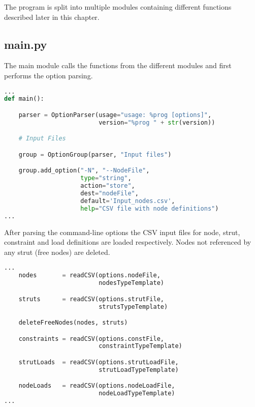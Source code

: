 The program is split into multiple modules containing different functions described later in this chapter.

\subsection{main.py}
\label{subsec:main.py}

The main module calls the functions from the different modules and first performs the option parsing.

\begin{inconsolata}
\begin{minipage}{\linewidth}
\begin{lstlisting}[language=python]
...
def main():

    parser = OptionParser(usage="usage: %prog [options]",
                          version="%prog " + str(version))

    # Input Files                                       

    group = OptionGroup(parser, "Input files")

    group.add_option("-N", "--NodeFile",
                     type="string",
                     action="store",
                     dest="nodeFile",
                     default='Input_nodes.csv',
                     help="CSV file with node definitions")
...
\end{lstlisting}
\end{minipage}
\end{inconsolata}

After parsing the command-line options the CSV input files for node, strut, constraint and load definitions are loaded respectively.
Nodes not referenced by any strut (free nodes) are deleted.

\begin{inconsolata}
\begin{minipage}{\linewidth}
\begin{lstlisting}[language=python]
...
    nodes       = readCSV(options.nodeFile,
                          nodesTypeTemplate)

    struts      = readCSV(options.strutFile,
                          strutsTypeTemplate)

    deleteFreeNodes(nodes, struts)

    constraints = readCSV(options.constFile,
                          constraintTypeTemplate)

    strutLoads  = readCSV(options.strutLoadFile,
                          strutLoadTypeTemplate)

    nodeLoads   = readCSV(options.nodeLoadFile,
                          nodeLoadTypeTemplate)
...
\end{lstlisting}
\end{minipage}
\end{inconsolata}

